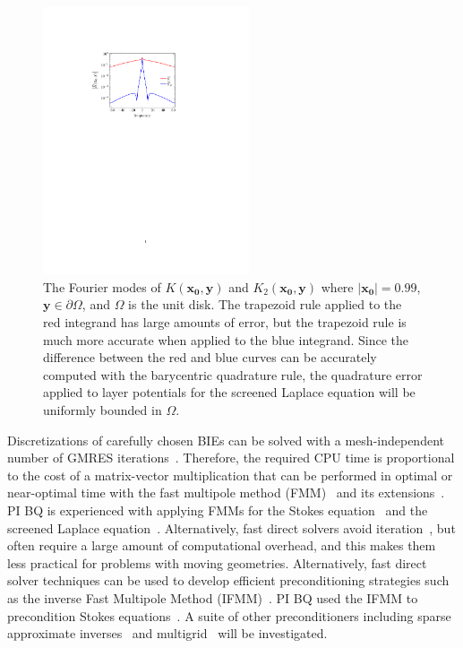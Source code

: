 %
\begin{figure}
\vspace*{-13pt}
\centerline{\includegraphics[width=2.4in]{figures/integrands}}
\vspace*{-13pt}
  \caption{{\footnotesize The Fourier modes of
  $K(\mathbf{x_0},\mathbf{y})$ and $K_2(\mathbf{x_0},\mathbf{y})$ where
  $|\mathbf{x_0}| = 0.99$, $\mathbf{y} \in \partial\Omega$, and
  $\Omega$ is the unit disk. The trapezoid rule applied to the red
  integrand has large amounts of error, but the trapezoid rule is much
  more accurate when applied to the blue integrand. Since the difference
  between the red and blue curves can be accurately computed with the
  barycentric quadrature rule, the quadrature error applied to layer
  potentials for the screened Laplace equation will be uniformly bounded
  in $\Omega$.}}
\label{fig:integrands}
\end{figure}
Discretizations of carefully chosen BIEs can be solved with a
mesh-independent number of GMRES
iterations~\cite{cam-ips-kel-mey-xue1996}. Therefore, the required CPU
time is proportional to the cost of a matrix-vector multiplication that
can be performed in optimal or near-optimal time with the fast multipole
method (FMM)~\cite{fmm5} and its extensions~\cite{fmm1, fmm2, fmm3,
fmm4, fmm6, fmm7, fmm8}. PI BQ is experienced with applying FMMs for the
Stokes equation~\cite{qua-bir2014, bys-sha-qua2020} and the screened
Laplace equation~\cite{kro-qua2011, qua2011}.  Alternatively, fast
direct solvers avoid iteration~\cite{fds2, fds3, fds4, fds5, fds6, fds7,
ho2016cpam1, minden2016, minden2017siammms}, but often require a large
amount of computational overhead, and this makes them less practical for
problems with moving geometries. Alternatively, fast direct solver
techniques can be used to develop efficient preconditioning strategies
such as the inverse Fast Multipole Method (IFMM)~\cite{cou-pou-dar2017}.
PI BQ used the IFMM to precondition Stokes
equations~\cite{qua-cou-dar2018}. A suite of other preconditioners
including sparse approximate inverses~\cite{che2000} and
multigrid~\cite{hem-sch1981, sch1982} will be investigated.


